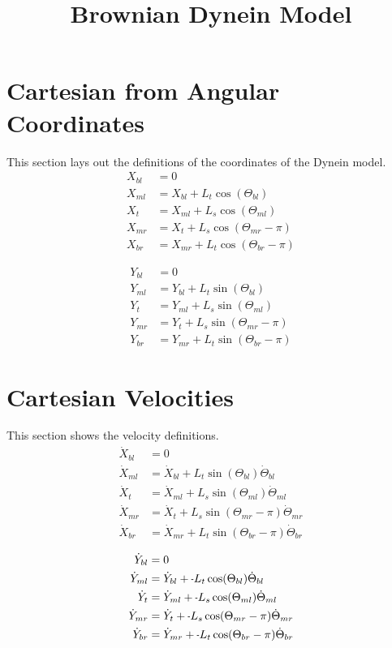 \documentclass[11pt, landscape]{article}
\title{Brownian Dynein Model}
\newcommand{\mn}{\scalebox{0.7}[1.0]{-}}
\begin{document}
\maketitle

\section{Cartesian from Angular Coordinates}
This section lays out the definitions of the coordinates of the Dynein model. \\
\begin{align}
  X_{bl} &= 0 \\
  X_{ml} &= X_{bl}+L_{t}\cos(\Theta_{bl}) \\
  X_{t}  &= X_{ml}+L_{s}\cos(\Theta_{ml}) \\
  X_{mr} &= X_{t} +L_{s}\cos(\Theta_{mr}-\pi) \\
  X_{br} &= X_{mr}+L_{t}\cos(\Theta_{br}-\pi)
\end{align}

\begin{align}
  Y_{bl} &= 0 \\
  Y_{ml} &= Y_{bl}+L_{t}\sin(\Theta_{bl}) \\
  Y_{t}  &= Y_{ml}+L_{s}\sin(\Theta_{ml}) \\
  Y_{mr} &= Y_{t} +L_{s}\sin(\Theta_{mr}-\pi) \\
  Y_{br} &= Y_{mr}+L_{t}\sin(\Theta_{br}-\pi)
\end{align}

\section{Cartesian Velocities}
This section shows the velocity definitions. \\
\begin{align}
  \dot{X}_{bl} &= 0 \\
  \dot{X}_{ml} &= \dot{X}_{bl} + L_{t}\sin(\Theta_{bl})      \dot{\Theta}_{bl} \\
  \dot{X}_{t } &= \dot{X}_{ml} + L_{s}\sin(\Theta_{ml})      \dot{\Theta}_{ml} \\
  \dot{X}_{mr} &= \dot{X}_{t } + L_{s}\sin(\Theta_{mr}-\pi)  \dot{\Theta}_{mr} \\
  \dot{X}_{br} &= \dot{X}_{mr} + L_{t}\sin(\Theta_{br}-\pi)  \dot{\Theta}_{br}
\end{align}  
             
\begin{align}                                                                          
  \dot{Y}_{bl} &= 0 \\                                                        
  \dot{Y}_{ml} &= \dot{Y}_{bl} + \mn L_{t}\cos(\Theta_{bl})      \dot{\Theta}_{bl} \\
  \dot{Y}_{t}  &= \dot{Y}_{ml} + \mn L_{s}\cos(\Theta_{ml})      \dot{\Theta}_{ml} \\
  \dot{Y}_{mr} &= \dot{Y}_{t } + \mn L_{s}\cos(\Theta_{mr}-\pi)  \dot{\Theta}_{mr} \\
  \dot{Y}_{br} &= \dot{Y}_{mr} + \mn L_{t}\cos(\Theta_{br}-\pi)  \dot{\Theta}_{br}
\end{align}
\end{document}
